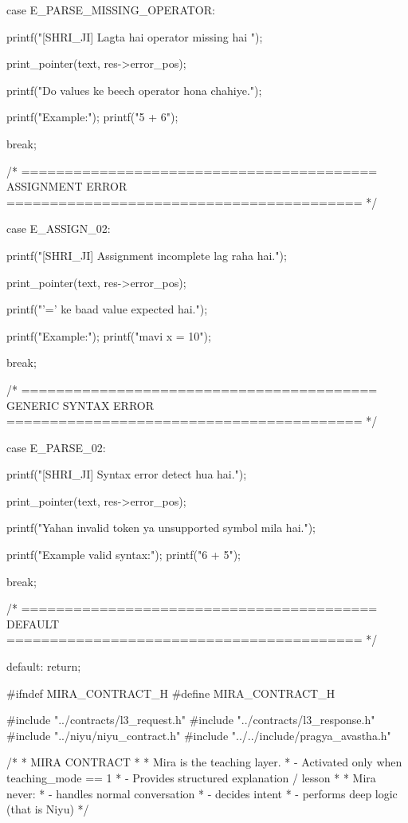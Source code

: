 \documentclass{article}
\begin{document}
{{    case E_PARSE_MISSING_OPERATOR:

        printf("[SHRI_JI] Lagta hai operator missing hai \n\n");

        print_pointer(text, res->error_pos);

        printf("Do values ke beech operator hona chahiye.\n\n");

        printf("Example:\n");
        printf("5 + 6\n");

        break;


    /* =========================================
       ASSIGNMENT ERROR
    ========================================= */

    case E_ASSIGN_02:

        printf("[SHRI_JI] Assignment incomplete lag raha hai.\n\n");

        print_pointer(text, res->error_pos);

        printf("'=' ke baad value expected hai.\n\n");

        printf("Example:\n");
        printf("mavi x = 10\n");

        break;


    /* =========================================
       GENERIC SYNTAX ERROR
    ========================================= */

    case E_PARSE_02:

        printf("[SHRI_JI] Syntax error detect hua hai.\n\n");

        print_pointer(text, res->error_pos);

        printf("Yahan invalid token ya unsupported symbol mila hai.\n\n");

        printf("Example valid syntax:\n");
        printf("6 + 5\n");

        break;


    /* =========================================
       DEFAULT
    ========================================= */

default:
    return;
    }
}
#ifndef MIRA_CONTRACT_H
#define MIRA_CONTRACT_H

#include "../contracts/l3_request.h"
#include "../contracts/l3_response.h"
#include "../niyu/niyu_contract.h"
#include "../../include/pragya_avastha.h"

/*
 * MIRA CONTRACT
 *
 * Mira is the teaching layer.
 * - Activated only when teaching_mode == 1
 * - Provides structured explanation / lesson
 *
 * Mira never:
 * - handles normal conversation
 * - decides intent
 * - performs deep logic (that is Niyu)
 */
\end{document}
